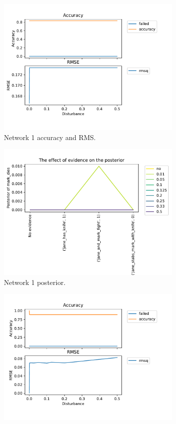 \begin{enumerate}
\begin{figure}[htbp]
\begin{subfigure}{.5\textwidth}
 \centering
\includegraphics[width=0.9\linewidth]{../experiments/VlekNetwork/plots/performance_KB1.pdf}
\caption{Network 1 accuracy and RMS.}
\label{kb1a1}
\end{subfigure}%
\begin{subfigure}{.5\textwidth}
 \centering
\includegraphics[width=0.9\linewidth]{../experiments/VlekNetwork/plots/posterior_KB1.pdf}
\caption{Network 1 posterior.}
\label{kb1a}
\end{subfigure}
\begin{subfigure}{.5\textwidth}
\centering
\includegraphics[width=0.9\linewidth]{../experiments/VlekNetwork/plots/performance_KB2.pdf}

\end{subfigure}
\end{figure}
\end{enumerate}
